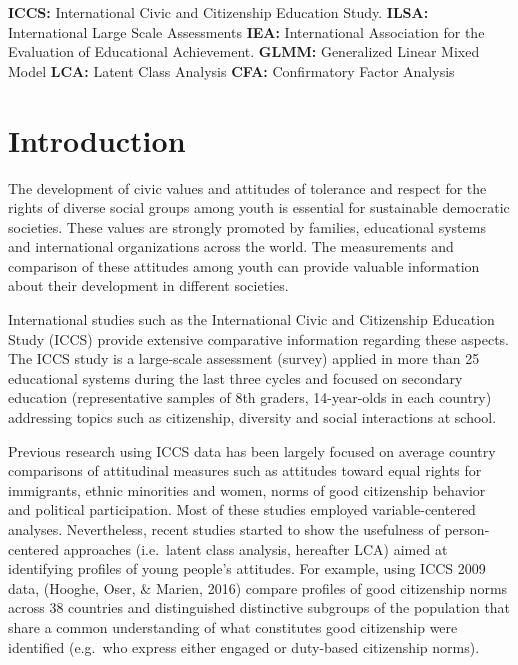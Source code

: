 \documentclass[12pt,a4paper,oneside]{reedthesis}
\begin{document}
  \begin{listabbrev}
    \textbf{ICCS:} International Civic and Citizenship Education Study. \newline
    \textbf{ILSA:} International Large Scale Assessments \newline
    \textbf{IEA:} International Association for the Evaluation of Educational Achievement. \newline
    \textbf{GLMM:} Generalized Linear Mixed Model \newline
    \textbf{LCA:} Latent Class Analysis \newline
    \textbf{CFA:} Confirmatory Factor Analysis \newline
  \end{listabbrev}
  \hypersetup{linkcolor=black}
  \setcounter{secnumdepth}{2}
  \setcounter{tocdepth}{2}
  \tableofcontents


  \listoftables

  \listoffigures


\mainmatter %
\pagestyle{fancyplain} %

\hypertarget{introduction}{%
\chapter{Introduction}\label{introduction}}

The development of civic values and attitudes of tolerance and respect for the rights of diverse social groups among youth is essential for sustainable democratic societies. These values are strongly promoted by families, educational systems and international organizations across the world. The measurements and comparison of these attitudes among youth can provide valuable information about their development in different societies.

International studies such as the International Civic and Citizenship Education Study (ICCS) provide extensive comparative information regarding these aspects. The ICCS study is a large-scale assessment (survey) applied in more than 25 educational systems during the last three cycles and focused on secondary education (representative samples of 8th graders, 14-year-olds in each country) addressing topics such as citizenship, diversity and social interactions at school.

Previous research using ICCS data has been largely focused on average country comparisons of attitudinal measures such as attitudes toward equal rights for immigrants, ethnic minorities and women, norms of good citizenship behavior and political participation. Most of these studies employed variable-centered analyses. Nevertheless, recent studies started to show the usefulness of person-centered approaches (i.e.~latent class analysis, hereafter LCA) aimed at identifying profiles of young people's attitudes. For example, using ICCS 2009 data, (Hooghe, Oser, \& Marien, 2016) compare profiles of good citizenship norms across 38 countries and distinguished distinctive subgroups of the population that share a common understanding of what constitutes good citizenship were identified (e.g.~who express either engaged or duty-based citizenship norms).
\end{document}
